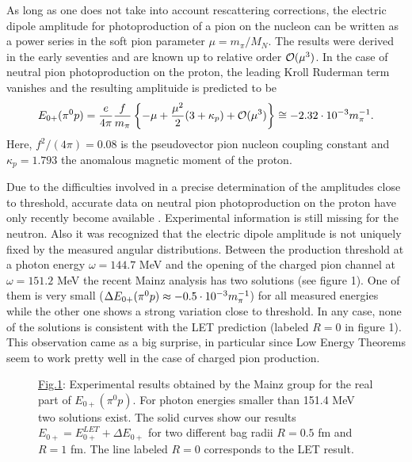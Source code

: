 As  long  as  one  does   not  take  into  account   rescattering  
corrections, the electric dipole amplitude for photoproduction of 
a pion on the nucleon can be written as a power series 
in the soft  pion  parameter  $\mu=m_\pi/M_{\scriptscriptstyle N}$.  
 The  results  were 
derived in the early seventies \cite{Bae} and are known up to relative order 
${\cal O}(\mu^3)$. In the case of neutral pion photoproduction on 
the proton,  the leading  Kroll  Ruderman  term vanishes  and the 
resulting amplituide is predicted to be
\begin{equation}
   E_{0+}   (\pi^0   p)  =  \frac{e}{4\pi} 
\frac{f}{m_\pi}  \left\{  -\mu  + \frac{\mu^2}{2}(3+\kappa_p  ) + 
{\cal O}(\mu^3) \right\} \cong -2.32 \cdot 10^{-3}m_\pi^{-1} . 
\end{equation} 
Here,  $f^2/(4\pi)  = 0.08$  is  the  pseudovector  pion  nucleon 
coupling  constant  and  $\kappa_p=1.793$  the anomalous  magnetic 
moment of the proton.

Due to the difficulties  involved  in a precise determination  of 
the amplitudes close to threshold, accurate data on neutral pion
photoproduction  on the proton have only recently become available 
\cite{Maz,Bec}. Experimental information is still missing for the neutron.   
Also it was recognized  that the electric  dipole  amplitude  is not 
uniquely fixed by the measured angular distributions. Between the 
production threshold at a photon energy $\omega=144.7$ MeV and the 
opening  of the charged  pion channel  at $\omega=151.2$ MeV the 
recent Mainz analysis  \cite{Bec}  has two solutions  (see figure 
1). One of them is very small ($\Delta E_{0+}(\pi^0p)\approx -0.5 \cdot 10^{-3}m_\pi^{-1}$) for 
all  measured  energies  while  the  other  one  shows  a  strong 
variation close to threshold.  In any case, none of the solutions 
is consistent  with the LET prediction  (labeled  $R=0$ in figure 
1).  This observation came as a big surprise, in particular since 
Low Energy  Theorems  seem  to work pretty  well  in the case  of 
charged pion production.

\begin{figure}[t]
\vspace{7cm}
\begin{center}
\begin{minipage}{14cm}
{\small \underline{Fig.1}: Experimental results obtained by the Mainz
group for the 
real part of $E_{0+}(\pi^0 p)$. For photon energies smaller than 
151.4 MeV two solutions exist. The solid curves show our results
$E_{0+}=E_{0+}^{LET}+\Delta E_{0+}$ for two different bag radii
$R= 0.5$ fm and $R=1$ fm. The line labeled $R=0$ corresponds to the
LET result.}
\end{minipage}
\end{center}
\end{figure}
 
